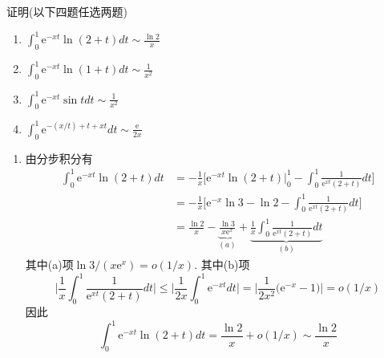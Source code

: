\begin{problem}[习题2.4]
证明(以下四题任选两题)
\begin{enumerate}
\item $\displaystyle
\int_0^1 \mathrm{e}^{-xt}\ln(2+t)dt \sim \frac{\ln 2}{x}
$
\item $\displaystyle
\int_0^1 \mathrm{e}^{-xt}\ln(1+t)dt \sim \frac{1}{x^2}
$
\item $\displaystyle
\int_0^1 \mathrm{e}^{-xt}\sin tdt \sim \frac{1}{x^2}
$
\item $\displaystyle
\int_0^1\mathrm{e}^{-(x/t)+t+xt}dt \sim \frac{\mathrm{e}}{2x}
$
\end{enumerate}
\end{problem}

\begin{solution}
\begin{enumerate}
\item 由分步积分有
\begin{align*}
\int_{0}^{1}\mathrm{e}^{-xt}\ln(2+t)dt & =-\frac{1}{x}\bigg[\mathrm{e}^{-xt}\ln(2+t)\Big|_{0}^{1}-\int_{0}^{1}\frac{1}{\mathrm{e}^{xt}(2+t)}dt\bigg]\\
 & =-\frac{1}{x}\bigg[\mathrm{e}^{-x}\ln3-\ln2-\int_{0}^{1}\frac{1}{\mathrm{e}^{xt}(2+t)}dt\bigg]\\
 & =\frac{\ln2}{x}-\underbrace{\frac{\ln3}{x\mathrm{e}^{x}}}_{(a)}+\underbrace{\frac{1}{x}\int_{0}^{1}\frac{1}{\mathrm{e}^{xt}(2+t)}dt}_{(b)}
\end{align*}
其中(a)项$\ln3/(x\mathrm{e}^{x})=o(1/x)$. 其中(b)项
\[
\Bigg|\frac{1}{x}\int_{0}^{1}\frac{1}{\mathrm{e}^{xt}(2+t)}dt\Bigg|\le\Bigg|\frac{1}{2x}\int_{0}^{1}\mathrm{e}^{-xt}dt\Bigg|=\Bigg|\frac{1}{2x^{2}}\big(\mathrm{e}^{-x}-1\big)\Bigg|=o(1/x)
\]
因此
\[
\int_{0}^{1}\mathrm{e}^{-xt}\ln(2+t)dt=\frac{\ln2}{x}+o(1/x)\sim\frac{\ln2}{x}
\]


\end{enumerate}
\end{solution}
